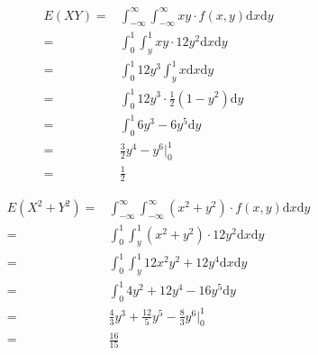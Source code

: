 \documentclass[a4paper,12pt]{ctexart}
\begin{document}
\begin{align*}
	E(XY) =& \int_{-\infty}^{\infty} \int_{-\infty}^{\infty} xy \cdot f(x,y) \mathrm{d}x \mathrm{d}y \\
	=& \int_{0}^{1} \int_{y}^{1} xy \cdot 12y^2 \mathrm{d}x \mathrm{d}y \\
	=& \int_{0}^{1} 12y^3 \int_{y}^{1} x \mathrm{d}x \mathrm{d}y \\
	=& \int_{0}^{1} 12y^3 \cdot \frac{1}{2} (1 - y^2) \mathrm{d}y \\
	=& \int_{0}^{1} 6y^3 - 6y^5 \mathrm{d}y \\
	=& \frac{3}{2} y^4 - y^6 \bigg|_0^1 \\
	=& \frac{1}{2}
\end{align*}

\begin{align*}
	E(X^2+Y^2) =& \int_{-\infty}^{\infty} \int_{-\infty}^{\infty} (x^2+y^2) \cdot f(x,y) \mathrm{d}x \mathrm{d}y \\
	=& \int_{0}^{1} \int_{y}^{1} (x^2+y^2) \cdot 12y^2 \mathrm{d}x \mathrm{d}y \\
	=& \int_{0}^{1} \int_{y}^{1} 12x^2y^2 + 12y^4 \mathrm{d}x \mathrm{d}y \\
	=& \int_{0}^{1} 4y^2 + 12y^4 - 16y^5 \mathrm{d}y \\
	=& \frac{4}{3} y^3 + \frac{12}{5} y^5 - \frac{8}{3} y^6 \bigg|_0^1 \\
	=& \frac{16}{15}
\end{align*}
\end{document}

